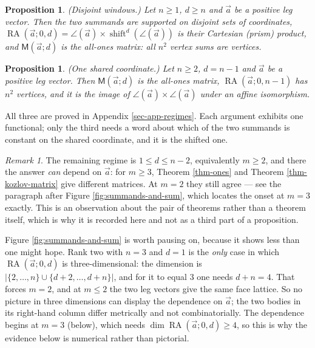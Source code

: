 \documentclass[11pt, a4paper, abstract=yes]{scrartcl}
\theoremstyle{definition}
\theoremstyle{remark}
\newtheorem{remark}[definition]{Remark}
\theoremstyle{plain}
\newtheorem{proposition}[definition]{Proposition}
\newcommand{\shift}{\operatorname{shift}}
\newcommand{\rasimp}{\angle}
\newcommand{\RA}{\operatorname{RA}}
\newcommand{\extten}{\mathsf{M}}
\begin{document}
\begin{proposition}
(\emph{Disjoint windows.}) Let \(n\ge1\), \(d\ge n\) and \(\vec a\) be a positive leg vector. Then the
two summands are supported on disjoint sets of coordinates,
\(\RA(\vec a;0,d)=\rasimp(\vec a)\times\shift^d(\rasimp(\vec a))\) is their Cartesian (prism)
product, and \(\extten(\vec a;d)\) is the all-ones matrix: all \(n^2\) vertex sums are vertices.
\label{prop:regimes-disjoint}
\label{prop-regimes-disjoint}
\end{proposition}

\begin{proposition}
(\emph{One shared coordinate.}) Let \(n\ge2\), \(d=n-1\) and \(\vec a\) be a positive leg vector. Then
\(\extten(\vec a;d)\) is the all-ones matrix, \(\RA(\vec a;0,n-1)\) has \(n^2\) vertices, and it is
the image of \(\rasimp(\vec a)\times\rasimp(\vec a)\) under an affine isomorphism.
\label{prop:regimes-boundary}
\label{prop-regimes-boundary}
\end{proposition}

All three are proved in Appendix \ref{sec-app-regimes}. Each argument exhibits one functional; only
the third needs a word about which of the two summands is constant on the shared coordinate, and it
is the shifted one.

\begin{remark}
The remaining regime is \(1\le d\le n-2\), equivalently \(m\ge2\), and there the answer \emph{can} depend
on \(\vec a\): for \(m\ge3\), Theorem \ref{thm-ones} and Theorem \ref{thm-kozlov-matrix} give different
matrices. At \(m=2\) they still agree --- see the paragraph after Figure \ref{fig:summands-and-sum},
which locates the onset at \(m=3\) exactly.
This is an observation about the pair of theorems rather than a theorem itself, which is why it is
recorded here and not as a third part of a proposition.
\label{rem-regimes-dependence}
\end{remark}

Figure \ref{fig:summands-and-sum} is worth pausing on, because it shows less than one might hope. Rank
two with \(n=3\) and \(d=1\) is the \emph{only} case in which \(\RA(\vec a;0,d)\) is three-dimensional:
the dimension is
\(\lvert\lbrace2,\dots,n\rbrace\cup\lbrace d+2,\dots,d+n\rbrace\rvert\), and for it to equal \(3\)
one needs \(d+n=4\). That forces \(m=2\), and at \(m\le2\) the two leg vectors give the same face
lattice. So no picture in three dimensions can display the dependence on \(\vec a\); the two bodies in
its right-hand column differ metrically and not combinatorially. The dependence begins at \(m=3\)
(below), which needs \(\dim\RA(\vec a;0,d)\ge4\), so this is why the evidence below is numerical
rather than pictorial.
\end{document}
